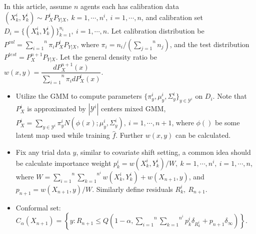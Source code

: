 \documentclass[12pt, a4paper, oneside]{article}
\begin{document}
    In this article, assume $n$ agents each has calibration data $(X_k^i,Y_k^i)\sim P_X^iP_{Y|X},\ k=1,\cdots,n^i,\ i=1,\cdots,n$, and calibration set $D_i=\{(X_k^i,Y_k^i)\}_{k=1}^{n_i},\ i=1,\cdots,n$. Let calibration distribution be $P^{cal}=\overset{n}{\underset{i=1}\sum}\pi_iP_X^iP_{Y|X}$, where $\pi_i=n_i/\left( \overset{n}{\underset{j=1}\sum}n_j \right)$, and the test distribution $P^{test}=P_X^{n+1}P_{Y|X}$. Let the general density ratio be $w(x,y)=\dfrac{dP_X^{n+1}(x)}{\overset{n}{\underset{i=1}\sum}\pi_idP_X^i(x)}$.
    \begin{itemize}
        \item Utilize the GMM to compute parameters $\{\pi_y^i,\mu_y^i,\Sigma_y^i\}_{y\in\mathcal{Y}^i}$ on $D_i$. Note that $P_X^i$ is approximated by $|\mathcal{Y}^i|$ centers mixed GMM, $P_X^i=\overset{}{\underset{y\in\mathcal{Y}^i}\sum\pi_y^iN(\phi(x);\mu_y^i,\Sigma_y^i)},\ i=1,\cdots,n+1$, where $\phi()$ be some latent map used while training $\hat{f}$. Further $w(x,y)$ can be calculated.
        \item Fix any trial data $y$, similar to covariate shift setting, a common idea should be calculate importance weight $p_k^i=w(X_k^i,Y_k^i)/W,\ k=1,\cdots,n^i,\ i=1,\cdots,n$, where $W=\overset{n}{\underset{i=1}\sum}\overset{n^i}{\underset{k=1}\sum}w(X_k^i,Y_k^i)+w(X_{n+1},y)$, and $p_{n+1}=w(X_{n+1},y)/W$. Similarly define residuals $R_k^i,\ R_{n+1}$.
        \item Conformal set: $C_\alpha(X_{n+1})=\left\{ y: R_{n+1}\leq Q(1-\alpha,\overset{n}{\underset{i=1}\sum}\overset{n^i}{\underset{k=1}\sum}p_k^i\delta_{R_k^i}+p_{n+1}\delta_{\infty})\right\}$.
    \end{itemize}
\newpage


\end{document}
